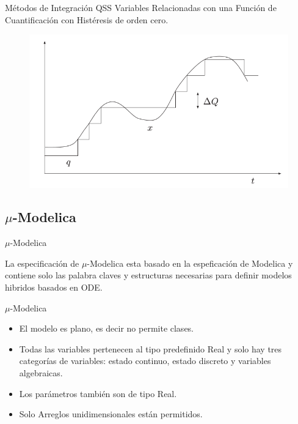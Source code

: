 \documentclass[10pt,handout]{beamer}
\begin{document}
\begin{frame}{Métodos de Integración QSS}
	  Variables Relacionadas con una Función de Cuantificación con Histéresis de orden cero.
	\begin{figure}[H]
	  \includegraphics[scale=0.35]{histeresis1}
	\end{figure}
\end{frame}

	\subsection{$\mu$-Modelica}

\begin{frame}{$\mu$-Modelica}

\begin{block}{La especificación de }
$\mu$-Modelica esta basado en la espeficación de Modelica y contiene solo las palabra claves y estructuras necesarias para definir modelos hibridos basados en ODE.
\end{block}
\end{frame}

\begin{frame}{$\mu$-Modelica}
	\begin{itemize}
	 \item<1-> El modelo es plano, es decir no permite clases.
	 \item<2-> Todas las variables pertenecen al tipo predefinido Real y solo hay tres categorías de variables: estado continuo, estado discreto y variables 
	algebraicas.
	 \item<3-> Los parámetros también son de tipo Real. 
	 \item<4-> Solo Arreglos unidimensionales están permitidos. 
	 \end{itemize}
\end{frame}
\end{document}
